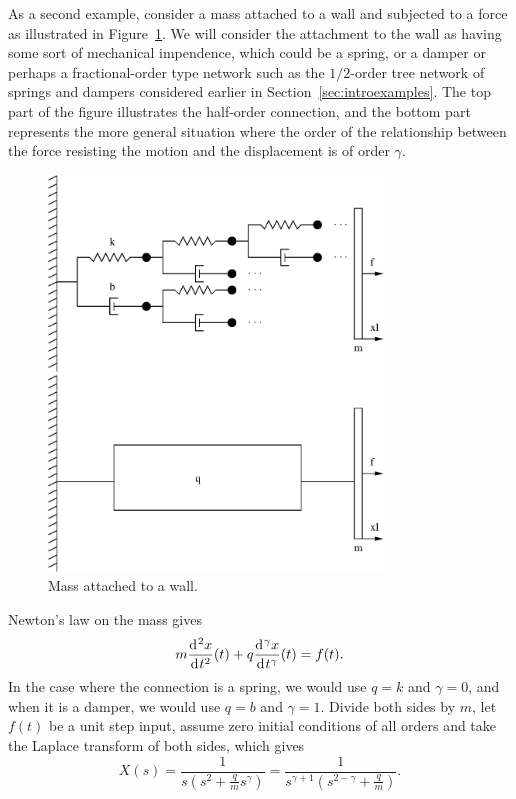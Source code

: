 \begin{example}
  As a second example, consider a mass attached to a wall and subjected to a force as illustrated in Figure~\ref{fig:masswall}. We will consider the attachment to the wall as having some sort of mechanical impendence, which could be a spring, or a damper or perhaps a fractional-order type network such as the $1/2$-order tree network of springs and dampers considered earlier in Section~\ref{sec:introexamples}. The top part of the figure illustrates the half-order connection, and the bottom part represents the more general situation where the order of the relationship between the force resisting the motion and the displacement is of order $\gamma$.

  \begin{figure}
    \centering
    \includegraphics[width=3.5in]{figs/structurewall}
    \caption{Mass attached to a wall.}
    \label{fig:masswall}
  \end{figure}

  Newton's law on the mass gives
  \begin{equation*}
    m \frac{\operatorname{d}\hspace*{-1pt}^2 x}{\operatorname{d}\hspace*{-1pt} t^2}(t) + q \frac{\operatorname{d}\hspace*{-1pt}^\gamma x}{\operatorname{d}\hspace*{-1pt} t^\gamma}(t) = f(t).
  \end{equation*}
  In the case where the connection is a spring, we would use $q = k$ and $\gamma = 0$, and when it is a damper, we would use $q = b$ and $\gamma = 1$. Divide both sides by $m$, let $f(t)$ be a unit step input, assume zero initial conditions of all orders and take the Laplace transform of both sides, which gives
  \begin{equation}
    X(s) = \frac{1}{s \left(s^2 + \frac{q}{m} s^\gamma \right)} = \frac{1}{s^{\gamma + 1} \left( s^{2 - \gamma} + \frac{q}{m} \right) }.
    \label{eq:sw1}
  \end{equation}


\end{example}
